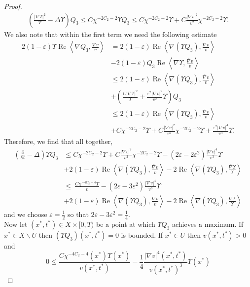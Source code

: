 \documentclass[12pt]{article}
\numberwithin{equation}{section}
\renewcommand{\d}{\partial}
\newcommand{\e}{\varepsilon}
\DeclareMathOperator{\Real}{Re}
\newcommand{\oo}[1]{\overline{#1}}
\newcommand{\parabolic}[1]{\left(\frac{\d}{\d t} - \Delta_{#1}\right)}
\newcommand{\ip}[1]{\left\langle#1\right\rangle}
\begin{document}
\begin{proof}
\begin{align*}
    \left(\frac{|\nabla \Upsilon|^2}{\Upsilon} - \Delta \Upsilon \right) Q_3 \leq  C \chi^{-2C_2-2} \Upsilon Q_3 \leq C\chi^{-2C_2-2}\Upsilon + C\frac{|\nabla v|^2}{v^2} \chi^{-2C_2-2}\Upsilon.
\end{align*}
We also note that within the first term we need the following estimate
\begin{align*}
    2(1-\e) \Upsilon \Real \ip{{\nabla Q_3}, \frac{\oo{\nabla} v}{v}} &= 2(1-\e) \Real \ip{{\nabla (\Upsilon Q_3)}, \frac{\oo{\nabla} v}{v}}\\
    &-2(1-\e) Q_3 \Real \ip{{\nabla \Upsilon}, \frac{\oo{\nabla} v}{v}}\\
    &\leq 2(1-\e) \Real \ip{{\nabla (\Upsilon Q_3)}, \frac{\oo{\nabla} v}{v}}\\
    &+ \left(\frac{C|\nabla \Upsilon|^2}{\Upsilon} + \frac{\e^2 |\nabla v|^2}{v^2} \Upsilon \right) Q_3\\
    &\leq 2(1-\e) \Real \ip{\nabla (\Upsilon Q_3), \frac{\oo{\nabla} v}{v}}\\
    &+ C \chi^{-2C_2-2}\Upsilon + C \frac{|\nabla v|^2}{ v^2} \chi^{-2C_2-2}\Upsilon + \frac{\e^2|\nabla v|^4}{v^3} \Upsilon.
\end{align*}
Therefore, we find that all together,
\begin{align*}
    \parabolic{} \Upsilon Q_3 &\leq C \chi^{-2C_2-2}\Upsilon + C \frac{|\nabla v|^2}{v^2} \chi^{-2C_2-2}\Upsilon -(2\e-2\e^2) \frac{|\nabla v|^4}{v^3} \Upsilon\\
    &+ 2(1-\e) \Real \ip{\nabla(\Upsilon Q_3), \frac{\oo{\nabla} v}{v}} - 2 \Real \ip{\nabla (\Upsilon Q_3), \frac{\oo{\nabla} \Upsilon}{\Upsilon}}\\
    &\leq\ \frac{C \chi^{-4C_2-4}\Upsilon}{v} -(2\e-3\e^2) \frac{|\nabla v|^4}{v^3} \Upsilon\\
    &+ 2(1-\e) \Real \ip{\nabla(\Upsilon Q_3), \frac{\oo{\nabla} v}{v}} - 2 \Real \ip{\nabla (\Upsilon Q_3), \frac{\oo{\nabla} \Upsilon}{\Upsilon}}
\end{align*}
and we choose $\e = \frac{1}{2}$ so that $2\e - 3\e^2 = \frac{1}{4}$.\\
Now let $(x^*,t^*) \in X \times [0,T)$ be a point at which $\Upsilon Q_3$ achieves a maximum. If $x^* \in X \backslash U$ then $(\Upsilon Q_3)(x^*,t^*) = 0$ is bounded. If $x^* \in U$ then $v(x^*,t^*) > 0$ and 
\begin{equation*}
    0 \leq \frac{C\chi^{-4C_2-4}(x^*)\Upsilon(x^*)}{v(x^*,t^*)} - \frac{1}{4} \frac{|\nabla v|^4(x^*,t^*)}{v(x^*,t^*)^3} \Upsilon(x^*)
\end{equation*}

\end{proof}
\end{document}
